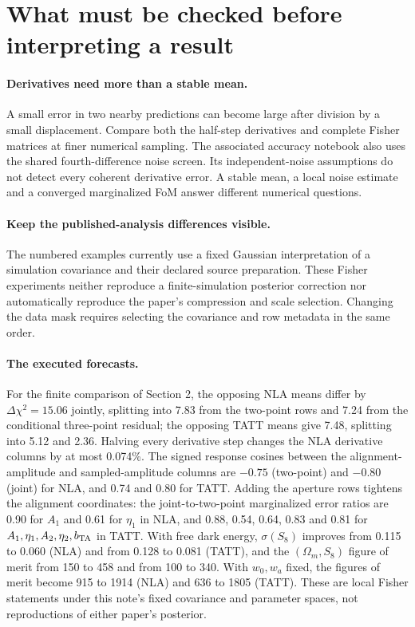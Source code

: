 \documentclass[11pt]{article}
\begin{document}
\section{What must be checked before interpreting a result}
\paragraph{Derivatives need more than a stable mean.}
A small error in two nearby predictions can become large after division by
a small displacement. Compare both the half-step derivatives and complete
Fisher matrices at finer numerical sampling. The associated accuracy
notebook also uses the shared fourth-difference noise screen. Its
independent-noise assumptions do not detect every coherent derivative
error. A stable mean, a local noise estimate and a converged marginalized
FoM answer different numerical questions.

\paragraph{Keep the published-analysis differences visible.}
The numbered examples currently use a fixed Gaussian interpretation of a
simulation covariance and their declared source preparation. These Fisher
experiments neither reproduce a finite-simulation posterior correction nor
automatically reproduce the paper's compression and scale selection.
Changing the data mask requires selecting the covariance and row metadata
in the same order.

\paragraph{The executed forecasts.}
For the finite comparison of Section 2, the opposing NLA means differ by
$\Delta\chi^2=15.06$ jointly, splitting into 7.83 from the two-point rows
and 7.24 from the conditional three-point residual; the opposing TATT
means give 7.48, splitting into 5.12 and 2.36. Halving every derivative
step changes the NLA derivative columns by at most 0.074\%. The signed
response cosines between the alignment-amplitude and sampled-amplitude
columns are $-0.75$ (two-point) and $-0.80$ (joint) for NLA, and 0.74 and
0.80 for TATT. Adding the aperture rows tightens the alignment coordinates: the
joint-to-two-point marginalized error ratios are 0.90 for $A_1$ and 0.61
for $\eta_1$ in NLA, and 0.88, 0.54, 0.64, 0.83 and 0.81 for
$A_1,\eta_1,A_2,\eta_2,b_{\rm TA}$ in TATT. With free dark energy, $\sigma(S_8)$ improves from
0.115 to 0.060 (NLA) and from 0.128 to 0.081 (TATT), and the
$(\Omega_m,S_8)$ figure of merit from 150 to 458 and from 100 to 340.
With $w_0,w_a$ fixed, the figures of merit become 915 to 1914 (NLA) and
636 to 1805 (TATT). These are local Fisher statements under this note's
fixed covariance and parameter spaces, not reproductions of either
paper's posterior.
\end{document}
